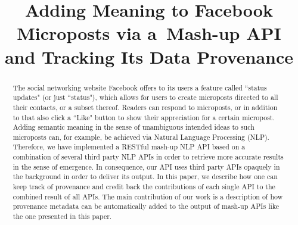 \documentclass[conference]{IEEEtran}
\begin{document}
%
\title{Adding Meaning to Facebook Microposts via a~Mash-up API and Tracking Its Data Provenance}

\author{
\and
{}
\and
{}
}

\maketitle

\begin{abstract}
The social networking website Facebook offers to its users a feature called ``status updates" (or just ``status"), which allows for users to create microposts directed to all their contacts, or a subset thereof. Readers can respond to microposts, or in addition to that also click a ``Like" button to show their appreciation for a certain micropost. Adding semantic meaning in the sense of unambiguous intended ideas to such microposts can, for example, be achieved via Natural Language Processing (NLP). Therefore, we have implemented a RESTful mash-up NLP API based on a combination of several third party NLP APIs in order to retrieve more accurate results in the sense of emergence. In consequence, our API uses third party APIs opaquely in the background in order to deliver its output. In this paper, we describe how one can keep track of provenance and credit back the contributions of each single API to the combined result of all APIs. The main contribution of our work is a description of how provenance metadata can be automatically added to the output of mash-up APIs like the one presented in this paper.
\end{abstract}
\end{document}
